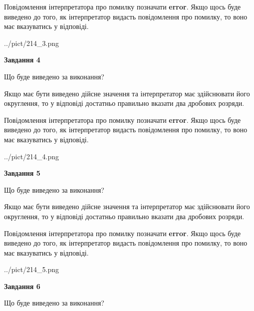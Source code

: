 \documentclass[12pt, ukrainian]{article}
\begin{document}
{\begin {Large}
Повідомлення інтерпретатора про помилку позначати \textbf{error}.
Якщо щось буде виведено до того, як інтерпретатор видасть повідомлення про помилку, 
то воно має вказуватись у відповіді. \par

\begin{center}
	{../pict/214_3.png}
\end{center}
\newpage

{\begin {center}\textbf{Завдання 4}\end {center}}\par
Що буде виведено за виконання? \par

Якщо має бути виведено дійсне значення та інтерпретатор має здійснювати його округлення, 
то у відповіді достатньо правильно вказати два дробових розряди.

Повідомлення інтерпретатора про помилку позначати \textbf{error}.
Якщо щось буде виведено до того, як інтерпретатор видасть повідомлення про помилку, 
то воно має вказуватись у відповіді. \par

\begin{center}
	{../pict/214_4.png}
\end{center}
\newpage

{\begin {center}\textbf{Завдання 5}\end {center}}\par
Що буде виведено за виконання? \par

Якщо має бути виведено дійсне значення та інтерпретатор має здійснювати його округлення, 
то у відповіді достатньо правильно вказати два дробових розряди.

Повідомлення інтерпретатора про помилку позначати \textbf{error}.
Якщо щось буде виведено до того, як інтерпретатор видасть повідомлення про помилку, 
то воно має вказуватись у відповіді. \par

\begin{center}
	{../pict/214_5.png}
\end{center}
\newpage

{\begin {center}\textbf{Завдання 6}\end {center}}\par
Що буде виведено за виконання? \par


\end{Large}}
\end{document}
